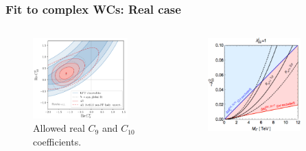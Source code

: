 \documentclass[mathserif, 10pt]{beamer}
\begin{document}
\begin{frame}\frametitle{Fit to complex WCs: Real case}
    \begin{columns}
        \begin{column}[t]{0.48\textwidth}
            \begin{figure}
                \centering
                \includegraphics[width =0.9\textwidth]{figures/contours_cropped.pdf}\\
\small{Allowed real $C_9$ and $C_{10}$ \\coefficients. \protect\footnotemark[8]}
            \end{figure}
\end{column}
        \begin{column}[t]{0.48\textwidth}
            \begin{figure}
                \centering
                \includegraphics[width =0.8\textwidth]{figures/BsmixvsRK.pdf}\\

\end{figure}
\end{column}
\end{columns}
\end{frame}
\end{document}
